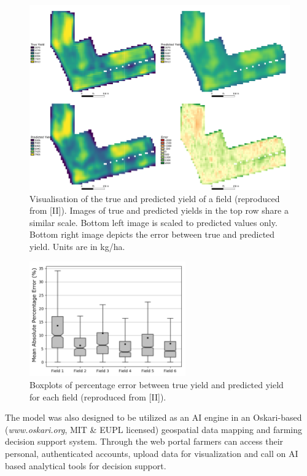\begin{figure}[htb]
    \centering
    \includegraphics[width = \textwidth]{Images/ii-FigurePallette.png}
    \caption{Visualisation of the true and predicted yield of a field (reproduced from [II]). Images of true and predicted yields in the top row share a similar scale. Bottom left image is scaled to predicted values only. Bottom right image depicts the error between true and predicted yield. Units are in kg/ha.}
    \label{fig:ii-FigurePallette}
\end{figure}

\begin{figure}[htb]
    \centering
    \includegraphics[width = 0.6\textwidth]{Images/ii-MAPE_boxplots.png}
    \caption{Boxplots of percentage error between true yield and predicted yield for each field (reproduced from [II]).}
    \label{fig:ii-boxplots}
\end{figure}

The model was also designed to be utilized as an AI engine in an Oskari-based (\emph{www.oskari.org}, MIT \& EUPL licensed) geospatial data mapping and farming decision support system. Through the web portal farmers can access their personal, authenticated accounts, upload data for visualization and call on AI based analytical tools for decision support.


